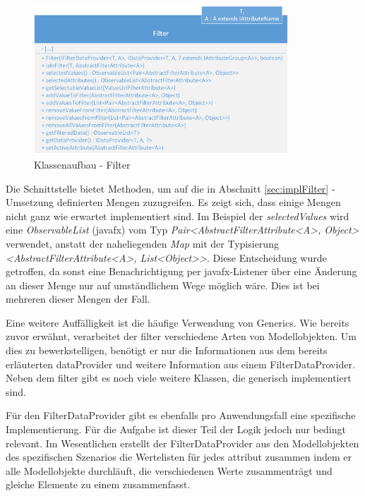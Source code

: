 \begin{figure}[H]
 \centering
 \includegraphics[width=0.85\textwidth]{grafiken/Class_Filter.png}
 \caption{Klassenaufbau - Filter}
 \label{fig:multiFilter1}
\end{figure}

Die Schnittstelle bietet Methoden, um auf die in Abschnitt \ref{sec:implFilter} - Umsetzung definierten Mengen zuzugreifen. Es zeigt sich, dass einige Mengen  nicht ganz wie erwartet implementiert sind. Im Beispiel der \textit{selectedValues} wird eine \textit{ObservableList} (\gls{javafx}) vom Typ \textit{Pair<AbstractFilterAttribute<A>, Object>} verwendet, anstatt der naheliegenden \textit{Map} mit der Typisierung \textit{<AbstractFilterAttribute<A>, List<Object>>}. Diese Entscheidung wurde getroffen, da sonst eine Benachrichtigung per \gls{javafx}-Listener über eine Änderung an dieser Menge nur auf umständlichem Wege möglich wäre. Dies ist bei mehreren dieser Mengen der Fall.

Eine weitere Auffälligkeit ist die häufige Verwendung von Generics. Wie bereits zuvor erwähnt, verarbeitet der \gls{filter} verschiedene Arten von Modellobjekten. Um dies zu bewerkstelligen, benötigt er nur die Informationen aus dem bereits erläuterten \gls{dataProvider} und weitere Information aus einem FilterDataProvider. Neben dem \gls{filter} gibt es noch viele weitere Klassen, die generisch implementiert sind.

Für den FilterDataProvider gibt es ebenfalls pro Anwendungsfall eine spezifische Implementierung. Für die Aufgabe ist dieser Teil der Logik jedoch nur bedingt relevant. Im Wesentlichen erstellt der FilterDataProvider aus den Modellobjekten des spezifischen Szenarios die Wertelisten für jedes \gls{attribut} zusammen indem er alle Modellobjekte durchläuft, die verschiedenen Werte zusammenträgt und gleiche Elemente zu einem zusammenfasst.

